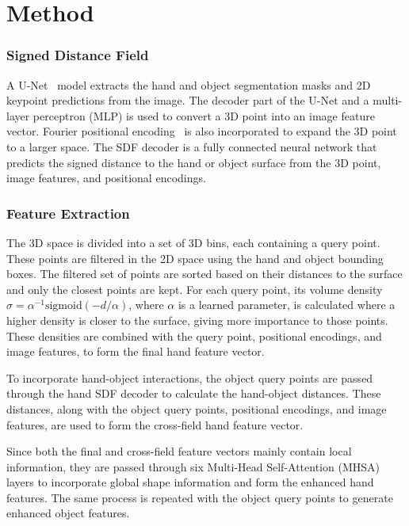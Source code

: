 \documentclass{article}
\begin{document}
\section*{Method}

\subsubsection*{Signed Distance Field}

A U-Net~\cite{ronneberger2015unet} model extracts the hand and object segmentation masks and 2D keypoint predictions from the image. The decoder part of the U-Net and a multi-layer perceptron (MLP) is used to convert a 3D point into an image feature vector. Fourier positional encoding~\cite{tancik2020fourier} is also incorporated to expand the 3D point to a larger space. The SDF decoder is a fully connected neural network that predicts the signed distance to the hand or object surface from the 3D point, image features, and positional encodings.

\subsubsection*{Feature Extraction}

The 3D space is divided into a set of 3D bins, each containing a query point. These points are filtered in the 2D space using the hand and object bounding boxes. The filtered set of points are sorted based on their distances to the surface and only the closest points are kept. For each query point, its volume density $\sigma = \alpha^{-1}\text{sigmoid}(-d/\alpha)$, where $\alpha$ is a learned parameter, is calculated where a higher density is closer to the surface, giving more importance to those points. These densities are combined with the query point, positional encodings, and image features, to form the final hand feature vector.

To incorporate hand-object interactions, the object query points are passed through the hand SDF decoder to calculate the hand-object distances. These distances, along with the object query points, positional encodings, and image features, are used to form the cross-field hand feature vector.

Since both the final and cross-field feature vectors mainly contain local information, they are passed through six Multi-Head Self-Attention (MHSA)~\cite{vaswani2017attention} layers to incorporate global shape information and form the enhanced hand features. The same process is repeated with the object query points to generate enhanced object features.
\end{document}

